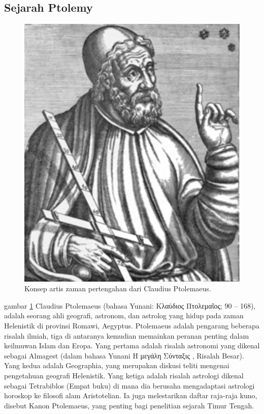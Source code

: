 \subsection{Sejarah Ptolemy}
	\begin{figure} [ht]
	\centerline{\includegraphics[width=1\textwidth]{figures/Ptolemyporg.PNG}}
	\caption{Konsep artis zaman pertengahan dari Claudius Ptolemaeus.}
	\label{Ptolemyporg}
	\end{figure}
    gambar \ref{Ptolemyporg} Claudius Ptolemaeus (bahasa Yunani: Κλαύδιος Πτολεμαῖος; 90 – 168), adalah seorang ahli geografi, astronom, dan astrolog yang hidup pada zaman Helenistik di provinsi Romawi, Aegyptus.
    Ptolemaeus adalah pengarang beberapa risalah ilmiah, tiga di antaranya kemudian memainkan peranan penting dalam keilmuwan Islam dan Eropa. Yang pertama adalah risalah astronomi yang dikenal sebagai Almagest (dalam bahasa Yunani Η μεγάλη Σύνταξις , Risalah Besar). Yang kedua adalah Geographia, yang merupakan diskusi teliti mengenai pengetahuan geografi Helenistik. Yang ketiga adalah risalah astrologi dikenal sebagai Tetrabiblos (Empat buku) di mana dia berusaha mengadaptasi astrologi horoskop ke filosofi alam Aristotelian. Ia juga melestarikan daftar raja-raja kuno, disebut Kanon Ptolemaeus, yang penting bagi penelitian sejarah Timur Tengah.
